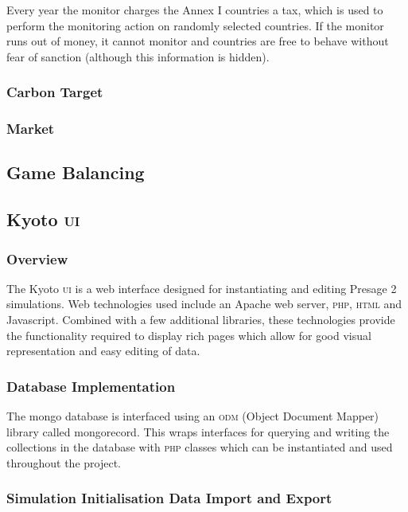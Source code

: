 Every year the monitor charges the Annex I countries a tax, which is used to perform the monitoring action on randomly selected countries. If the monitor runs out of money, it cannot monitor and countries are free to behave without fear of sanction (although this information is hidden).

\subsubsection{Carbon Target}

\subsubsection{Market}

\subsection{Game Balancing}


\subsection{Kyoto \textsc{ui}}

\subsubsection{Overview}

The Kyoto \textsc{ui} is a web interface designed for instantiating and editing Presage 2 simulations. Web technologies used include an Apache web server, \textsc{php}, \textsc{html} and Javascript. Combined with a few additional libraries, these technologies provide the functionality required to display rich pages which allow for good visual representation and easy editing of data.

\subsubsection{Database Implementation}

The mongo database is interfaced using an \textsc{odm} (Object Document Mapper) library called mongorecord. This wraps interfaces for querying and writing the collections in the database with \textsc{php} classes which can be instantiated and used throughout the project.

\subsubsection{Simulation Initialisation Data Import and Export}

